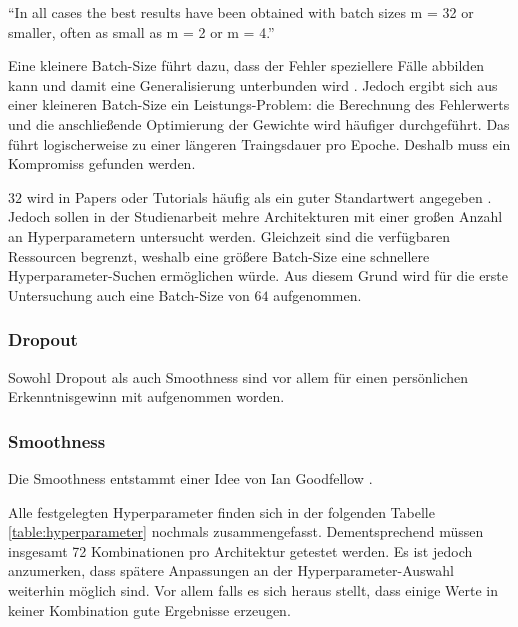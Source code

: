 \begin{center}
	\enquote{In all cases the best results have been obtained with batch sizes m = 32 or smaller, often as small as m = 2 or m = 4.}\cite[S. 16, Z. 5-7]{small-batch-size}
\end{center}

Eine kleinere Batch-Size führt dazu, dass der Fehler speziellere Fälle abbilden kann und damit eine Generalisierung unterbunden wird \cite{tutorial:tune-batch-size-machinelearningmastery}.
Jedoch ergibt sich aus einer kleineren Batch-Size ein Leistungs-Problem: die Berechnung des Fehlerwerts und die anschließende Optimierung der Gewichte wird häufiger durchgeführt.
Das führt logischerweise zu einer längeren Traingsdauer pro Epoche.
Deshalb muss ein Kompromiss gefunden werden.
\newline

\(32\) wird in Papers oder Tutorials häufig als ein guter Standartwert angegeben \cite{default-batch-size}.
Jedoch sollen in der Studienarbeit mehre Architekturen mit einer großen Anzahl an Hyperparametern untersucht werden.
Gleichzeit sind die verfügbaren Ressourcen begrenzt, weshalb eine größere Batch-Size eine schnellere Hyperparameter-Suchen ermöglichen würde.
Aus diesem Grund wird für die erste Untersuchung auch eine Batch-Size von \(64\) aufgenommen.

\subsubsection{Dropout}
Sowohl Dropout als auch Smoothness sind vor allem für einen persönlichen Erkenntnisgewinn mit aufgenommen worden.


\subsubsection{Smoothness}
Die Smoothness entstammt einer Idee von Ian Goodfellow \cite{ian-goodfellow-onesided-label-smoothing}.
\newline

Alle festgelegten Hyperparameter finden sich in der folgenden Tabelle \ref{table:hyperparameter} nochmals zusammengefasst.
Dementsprechend müssen insgesamt 72 Kombinationen pro Architektur getestet werden. 
Es ist jedoch anzumerken, dass spätere Anpassungen an der Hyperparameter-Auswahl weiterhin möglich sind.
Vor allem falls es sich heraus stellt, dass einige Werte in keiner Kombination gute Ergebnisse erzeugen.


